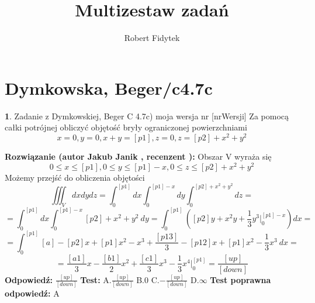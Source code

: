 \documentclass[12pt, a4paper]{article}
\title{Multizestaw zadań}
\author{Robert Fidytek}
\date{}
\theoremstyle{definition} %
\newtheorem{zad}{}
\newcommand{\kategoria}[1]{\section{#1}} %
\newcommand{\zadStart}[1]{\begin{zad}#1\newline} %
\newcommand{\zadStop}{\end{zad}}   %
\newcommand{\rozwStart}[2]{\noindent \textbf{Rozwiązanie (autor #1 , recenzent #2): }\newline} %
\newcommand{\rozwStop}{\newline}                                            %
\newcommand{\odpStart}{\noindent \textbf{Odpowiedź:}\newline}    %
\newcommand{\odpStop}{\newline}                                             %
\newcommand{\testStart}{\noindent \textbf{Test:}\newline} %
\newcommand{\testStop}{\newline} %
\newcommand{\kluczStart}{\noindent \textbf{Test poprawna odpowiedź:}\newline} %
\newcommand{\kluczStop}{\newline} %
\begin{document}
\maketitle


\kategoria{Dymkowska, Beger/c4.7c}
\zadStart{Zadanie z Dymkowskiej, Beger C 4.7c) moja wersja nr [nrWersji]}
Za pomocą całki potrójnej obliczyć objętość bryły ograniczonej powierzchniami
$$x=0, y=0, x+y=[p1], z=0, z=[p2]+x^2+y^2$$
\zadStop
\rozwStart{Jakub Janik}{}
Obszar V wyraża się $$0 \leq x \leq [p1], 0 \leq y \leq [p1]-x, 0 \leq z \leq [p2]+x^2+y^2$$
Możemy przejść do obliczenia objętości
$$\iiint_V dxdydz=\int_0^{[p1]}dx\int_0^{[p1]-x}dy\int_0^{[p2]+x^2+y^2}dz=$$
$$=\int_0^{[p1]}dx\int_0^{[p1]-x}[p2]+x^2+y^2\ dy=\int_0^{[p1]}([p2]y+x^2y+\frac{1}{3}y^3\Big|_0^{[p1]-x})dx=$$
$$=\int_0^{[p1]}[a]-[p2]x+[p1]x^2-x^3+\frac{[p13]}{3}-[p12]x+[p1]x^2-\frac{1}{3}x^3\ dx=$$
$$=\frac{[a1]}{3}x-\frac{[b1]}{2}x^2+\frac{[c1]}{3}x^3-\frac{1}{3}x^4\Big|_0^{[p1]}=\frac{[up]}{[down]}$$
\rozwStop
\odpStart
$\frac{[up]}{[down]}$
\odpStop
\testStart
A.$\frac{[up]}{[down]}$
B.$0$
C.$-\frac{[up]}{[down]}$
D.$\infty$
\testStop
\kluczStart
A
\kluczStop
\end{document}
